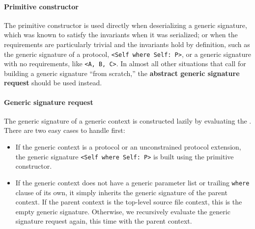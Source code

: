 \documentclass[../generics]{subfiles}
\begin{document}
\paragraph{Primitive constructor}
%
%
%
%
The primitive constructor is used directly when deserializing a generic signature, which was known to satisfy the invariants when it was serialized; or when the requirements are particularly trivial and the invariants hold by definition, such as the generic signature of a protocol, \verb|<Self where Self: P>|, or a generic signature with no requirements, like \verb|<A, B, C>|. In almost all other situations that call for building a generic signature ``from scratch,'' the \textbf{abstract generic signature request} should be used instead.

\paragraph{Generic signature request}
%
%
%
%
%
%
The generic signature of a generic context is constructed lazily by evaluating the . There are two easy cases to handle first:
\begin{itemize}
\item If the generic context is a protocol or an unconstrained protocol extension, the generic signature \verb|<Self where Self: P>| is built using the primitive constructor.

\item If the generic context does not have a generic parameter list or trailing \texttt{where} clause of its own, it simply inherits the generic signature of the parent context. If the parent context is the top-level source file context, this is the empty generic signature. Otherwise, we recursively evaluate the generic signature request again, this time with the parent context.
\end{itemize}
\end{document}
